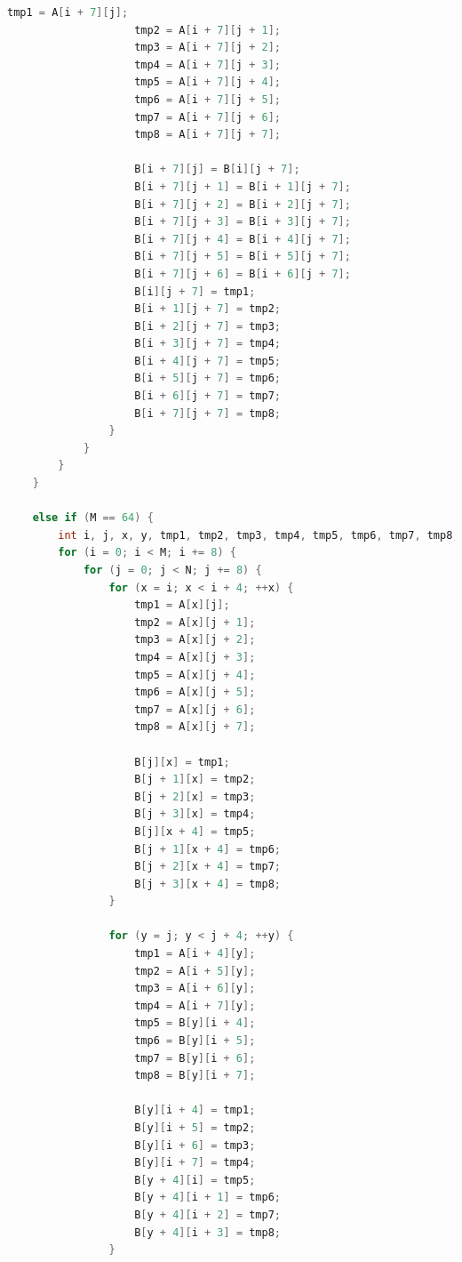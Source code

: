 \documentclass{article}
\begin{document}
\begin{lstlisting}[language=c++, caption={trans.c}, label={cd:2}]
                    tmp1 = A[i + 7][j];
                    tmp2 = A[i + 7][j + 1];
                    tmp3 = A[i + 7][j + 2];
                    tmp4 = A[i + 7][j + 3];
                    tmp5 = A[i + 7][j + 4];
                    tmp6 = A[i + 7][j + 5];
                    tmp7 = A[i + 7][j + 6];
                    tmp8 = A[i + 7][j + 7];

                    B[i + 7][j] = B[i][j + 7];
                    B[i + 7][j + 1] = B[i + 1][j + 7];
                    B[i + 7][j + 2] = B[i + 2][j + 7];
                    B[i + 7][j + 3] = B[i + 3][j + 7];
                    B[i + 7][j + 4] = B[i + 4][j + 7];
                    B[i + 7][j + 5] = B[i + 5][j + 7];
                    B[i + 7][j + 6] = B[i + 6][j + 7];
                    B[i][j + 7] = tmp1;
                    B[i + 1][j + 7] = tmp2;
                    B[i + 2][j + 7] = tmp3;
                    B[i + 3][j + 7] = tmp4;
                    B[i + 4][j + 7] = tmp5;
                    B[i + 5][j + 7] = tmp6;
                    B[i + 6][j + 7] = tmp7;
                    B[i + 7][j + 7] = tmp8;
                }
            }
        }
    }

    else if (M == 64) {
        int i, j, x, y, tmp1, tmp2, tmp3, tmp4, tmp5, tmp6, tmp7, tmp8;
        for (i = 0; i < M; i += 8) {
            for (j = 0; j < N; j += 8) {
                for (x = i; x < i + 4; ++x) {
                    tmp1 = A[x][j];
                    tmp2 = A[x][j + 1];
                    tmp3 = A[x][j + 2];
                    tmp4 = A[x][j + 3];
                    tmp5 = A[x][j + 4];
                    tmp6 = A[x][j + 5];
                    tmp7 = A[x][j + 6];
                    tmp8 = A[x][j + 7];

                    B[j][x] = tmp1;
                    B[j + 1][x] = tmp2;
                    B[j + 2][x] = tmp3;
                    B[j + 3][x] = tmp4;
                    B[j][x + 4] = tmp5;
                    B[j + 1][x + 4] = tmp6;
                    B[j + 2][x + 4] = tmp7;
                    B[j + 3][x + 4] = tmp8;
                }

                for (y = j; y < j + 4; ++y) {
                    tmp1 = A[i + 4][y];
                    tmp2 = A[i + 5][y];
                    tmp3 = A[i + 6][y];
                    tmp4 = A[i + 7][y];
                    tmp5 = B[y][i + 4];
                    tmp6 = B[y][i + 5];
                    tmp7 = B[y][i + 6];
                    tmp8 = B[y][i + 7];

                    B[y][i + 4] = tmp1;
                    B[y][i + 5] = tmp2;
                    B[y][i + 6] = tmp3;
                    B[y][i + 7] = tmp4;
                    B[y + 4][i] = tmp5;
                    B[y + 4][i + 1] = tmp6;
                    B[y + 4][i + 2] = tmp7;
                    B[y + 4][i + 3] = tmp8;
                }


\end{lstlisting}
\end{document}

